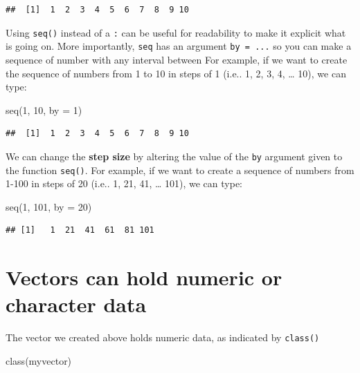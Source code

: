 \documentclass[
]{book}
\newenvironment{Shaded}{\begin{snugshade}}{\end{snugshade}}
\newcommand{\AttributeTok}[1]{\textcolor[rgb]{0.77,0.63,0.00}{#1}}
\newcommand{\DecValTok}[1]{\textcolor[rgb]{0.00,0.00,0.81}{#1}}
\newcommand{\FunctionTok}[1]{\textcolor[rgb]{0.00,0.00,0.00}{#1}}
\newcommand{\NormalTok}[1]{#1}
\begin{document}
\begin{verbatim}
##  [1]  1  2  3  4  5  6  7  8  9 10
\end{verbatim}

Using \texttt{seq()} instead of a \texttt{:} can be useful for readability to make it explicit what is going on. More importantly, \texttt{seq} has an argument \texttt{by\ =\ ...} so you can make a sequence of number with any interval between For example, if we want to create the sequence of numbers from 1 to 10 in steps of 1 (i.e.. 1, 2, 3, 4, \ldots{} 10), we can type:

\begin{Shaded}
\begin{Highlighting}[]
\FunctionTok{seq}\NormalTok{(}\DecValTok{1}\NormalTok{, }\DecValTok{10}\NormalTok{,}
    \AttributeTok{by =} \DecValTok{1}\NormalTok{)}
\end{Highlighting}
\end{Shaded}

\begin{verbatim}
##  [1]  1  2  3  4  5  6  7  8  9 10
\end{verbatim}

We can change the \textbf{step size} by altering the value of the \texttt{by} argument given to the function \texttt{seq()}. For example, if we want to create a sequence of numbers from 1-100 in steps of 20 (i.e.. 1, 21, 41, \ldots{} 101), we can type:

\begin{Shaded}
\begin{Highlighting}[]
\FunctionTok{seq}\NormalTok{(}\DecValTok{1}\NormalTok{, }\DecValTok{101}\NormalTok{,}
    \AttributeTok{by =} \DecValTok{20}\NormalTok{)}
\end{Highlighting}
\end{Shaded}

\begin{verbatim}
## [1]   1  21  41  61  81 101
\end{verbatim}

\hypertarget{vectors-can-hold-numeric-or-character-data}{%
\section{Vectors can hold numeric or character data}\label{vectors-can-hold-numeric-or-character-data}}

The vector we created above holds numeric data, as indicated by \texttt{class()}

\begin{Shaded}
\begin{Highlighting}[]
\FunctionTok{class}\NormalTok{(myvector)}
\end{Highlighting}
\end{Shaded}
\end{document}
